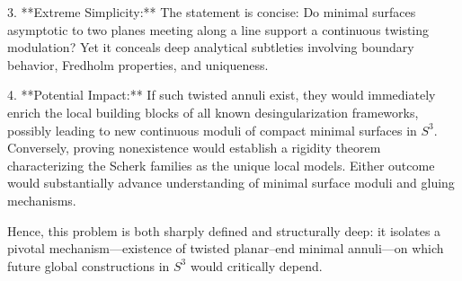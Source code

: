 3. **Extreme Simplicity:**  
The statement is concise: Do minimal surfaces asymptotic to two planes meeting along a line support a continuous twisting modulation? Yet it conceals deep analytical subtleties involving boundary behavior, Fredholm properties, and uniqueness.  

4. **Potential Impact:**  
If such twisted annuli exist, they would immediately enrich the local building blocks of all known desingularization frameworks, possibly leading to new continuous moduli of compact minimal surfaces in $S^3$. Conversely, proving nonexistence would establish a rigidity theorem characterizing the Scherk families as the unique local models. Either outcome would substantially advance understanding of minimal surface moduli and gluing mechanisms.  

Hence, this problem is both sharply defined and structurally deep: it isolates a pivotal mechanism—existence of twisted planar–end minimal annuli—on which future global constructions in $S^3$ would critically depend.